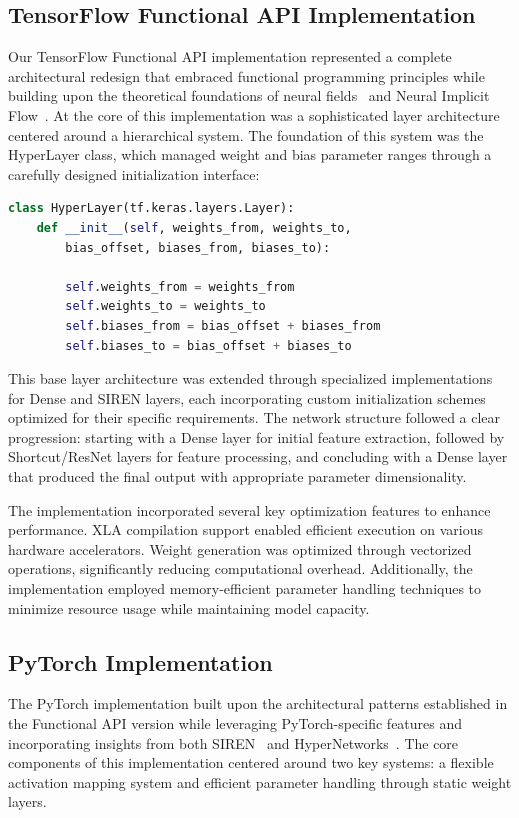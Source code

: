 \documentclass[10pt,journal,compsoc,onecolumn]{IEEEtran}
\begin{document}
\subsection{TensorFlow Functional API Implementation}
Our TensorFlow Functional API implementation represented a complete architectural redesign that embraced functional programming principles while building upon the theoretical foundations of neural fields~\cite{neural_fields2022} and Neural Implicit Flow~\cite{nif2023}. At the core of this implementation was a sophisticated layer architecture centered around a hierarchical system. The foundation of this system was the HyperLayer class, which managed weight and bias parameter ranges through a carefully designed initialization interface:

\begin{lstlisting}[language=Python]
class HyperLayer(tf.keras.layers.Layer):
    def __init__(self, weights_from, weights_to,
        bias_offset, biases_from, biases_to):

        self.weights_from = weights_from
        self.weights_to = weights_to
        self.biases_from = bias_offset + biases_from
        self.biases_to = bias_offset + biases_to
\end{lstlisting}

This base layer architecture was extended through specialized implementations for Dense and SIREN layers, each incorporating custom initialization schemes optimized for their specific requirements. The network structure followed a clear progression: starting with a Dense layer for initial feature extraction, followed by Shortcut/ResNet layers for feature processing, and concluding with a Dense layer that produced the final output with appropriate parameter dimensionality.

The implementation incorporated several key optimization features to enhance performance. XLA compilation support enabled efficient execution on various hardware accelerators. Weight generation was optimized through vectorized operations, significantly reducing computational overhead. Additionally, the implementation employed memory-efficient parameter handling techniques to minimize resource usage while maintaining model capacity.

\subsection{PyTorch Implementation}
The PyTorch implementation built upon the architectural patterns established in the Functional API version while leveraging PyTorch-specific features and incorporating insights from both SIREN~\cite{siren2020} and HyperNetworks~\cite{hypernetworks2016}. The core components of this implementation centered around two key systems: a flexible activation mapping system and efficient parameter handling through static weight layers.
\end{document}
